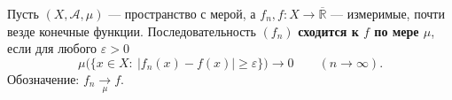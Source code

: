 \label{definition:33}

\begin{definition}
Пусть $(X,\mathcal A,\mu)$ --- пространство с мерой, а $f_n,f:X\to\overline{\mathbb R}$ --- измеримые, почти везде конечные функции.
Последовательность $(f_n)$ \textbf{сходится к $f$ по мере $\mu$}, если для любого $\varepsilon>0$
\[
  \mu\bigl(\{x\in X:\ |f_n(x)-f(x)|\ge\varepsilon\}\bigr)
  \longrightarrow0\qquad(n\to\infty).
\]
Обозначение: $f_n\xrightarrow[\mu]{}f$.
\end{definition}
